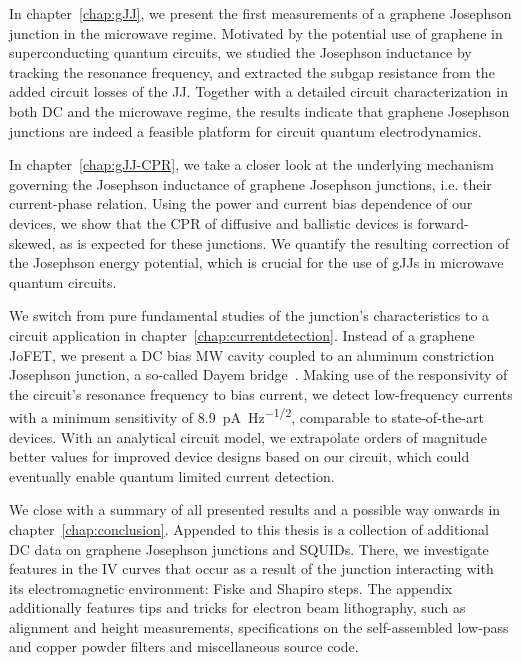 In chapter~\ref{chap:gJJ}, we present the first measurements of a graphene Josephson junction in the microwave regime.
%
Motivated by the potential use of graphene in superconducting quantum circuits, we studied the Josephson inductance by tracking the resonance frequency, and extracted the subgap resistance from the added circuit losses of the JJ.
%
Together with a detailed circuit characterization in both DC and the microwave regime, the results indicate that graphene Josephson junctions are indeed a feasible platform for circuit quantum electrodynamics.


In chapter~\ref{chap:gJJ-CPR}, we take a closer look at the underlying mechanism governing the Josephson inductance of graphene Josephson junctions, i.e. their current-phase relation.
%
Using the power and current bias dependence of our devices, we show that the CPR of diffusive and ballistic devices is forward-skewed, as is expected for these junctions.
%
We quantify the resulting correction of the Josephson energy potential, which is crucial for the use of gJJs in microwave quantum circuits.

We switch from pure fundamental studies of the junction's characteristics to a circuit application in chapter~\ref{chap:currentdetection}.
%
Instead of a graphene JoFET, we present a DC bias MW cavity coupled to an aluminum constriction Josephson junction, a so-called Dayem bridge~\cite{andersonRadioFrequencyEffectsSuperconducting1964}.
%
Making use of the responsivity of the circuit's resonance frequency to bias current, we detect low-frequency currents with a minimum sensitivity of \SI{8.9}{\pico\ampere\per\hertz\tothe{1/2}}, comparable to state-of-the-art devices.
%
With an analytical circuit model, we extrapolate orders of magnitude better values for improved device designs based on our circuit, which could eventually enable quantum limited current detection.


We close with a summary of all presented results and a possible way onwards in chapter~\ref{chap:conclusion}.
%
Appended to this thesis is a collection of additional DC data on graphene Josephson junctions and SQUIDs.
%
There, we investigate features in the IV curves that occur as a result of the junction interacting with its electromagnetic environment: Fiske and Shapiro steps.
%
The appendix additionally features tips and tricks for electron beam lithography, such as alignment and height measurements, specifications on the self-assembled low-pass and copper powder filters and miscellaneous source code.




